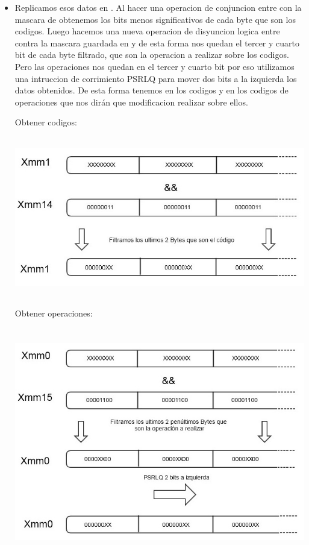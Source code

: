 \begin{itemize}
\item Replicamos esos datos en . Al hacer una operacion de conjuncion entre  con la mascara de  obtenemos los bits menos significativos de cada byte que son los codigos. Luego hacemos una nueva operacion de disyuncion logica entre  contra la mascara guardada en  y de esta forma nos quedan el tercer y cuarto bit de cada byte filtrado, que son la operacion a realizar sobre los codigos. Pero las operaciones nos quedan en el tercer y cuarto bit por eso utilizamos una intruccion de corrimiento PSRLQ para mover dos bits a la izquierda los datos obtenidos. De esta forma tenemos en  los codigos y en  los codigos de operaciones que nos dirán que modificacion realizar sobre ellos. 

Obtener codigos:

\includegraphics[height=7cm]{codigos.jpg} 

Obtener operaciones:

\includegraphics[height=10cm]{operaciones.jpg} 


\end{itemize}
